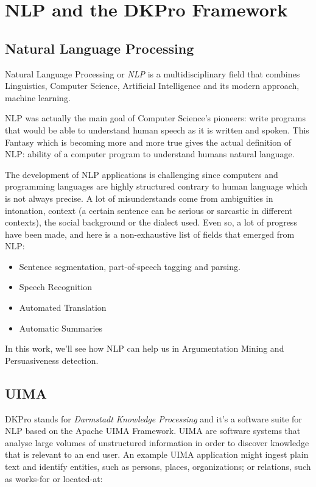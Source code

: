 \section{NLP and the DKPro Framework}
\subsection{Natural Language Processing}
Natural Language Processing or \emph{NLP} is a multidisciplinary field that combines Linguistics, Computer Science, Artificial Intelligence and its modern approach, \Gls{machine learning}.

NLP was actually the main goal of Computer Science's pioneers: write programs that would be able to understand human speech as it is written and spoken. This Fantasy which is becoming more and more true gives the actual definition of NLP:  ability of a computer program to understand humans natural language. 

The development of NLP applications is challenging since computers and programming languages are highly structured contrary to human language which is not always precise. A lot of misunderstands come from ambiguities in intonation, context (a certain sentence can be serious or sarcastic in different contexts), the social background or the dialect used. Even so, a lot of progress have been made, and here is a non-exhaustive list of fields that emerged from NLP:
\begin{itemize}
  \item Sentence segmentation, part-of-speech tagging and parsing.  
  \item Speech Recognition
  \item Automated Translation
  \item Automatic Summaries
\end{itemize}

In this work, we'll see how NLP can help us in Argumentation Mining and Persuasiveness detection. 
 
\subsection{UIMA}
DKPro stands for \emph{Darmstadt Knowledge Processing}
\cite{GurevychEtal2007dkpro0} and it's a software suite for NLP based on the Apache UIMA Framework. UIMA are software systems that analyse large volumes of unstructured information in order to discover knowledge that is relevant to an end user. An example UIMA application might ingest plain text and identify entities, such as persons, places, organizations; or relations, such as works-for or located-at:

